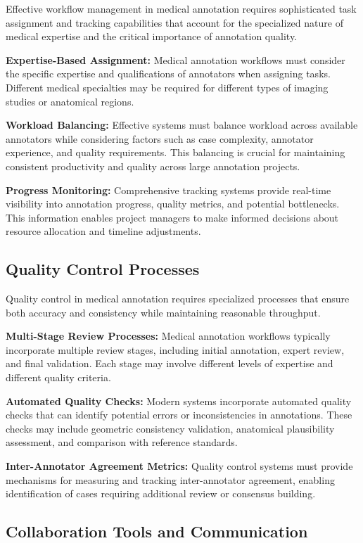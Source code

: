 Effective workflow management in medical annotation requires sophisticated task assignment and tracking capabilities that account for the specialized nature of medical expertise and the critical importance of annotation quality.

\textbf{Expertise-Based Assignment:} Medical annotation workflows must consider the specific expertise and qualifications of annotators when assigning tasks. Different medical specialties may be required for different types of imaging studies or anatomical regions.

\textbf{Workload Balancing:} Effective systems must balance workload across available annotators while considering factors such as case complexity, annotator experience, and quality requirements. This balancing is crucial for maintaining consistent productivity and quality across large annotation projects.

\textbf{Progress Monitoring:} Comprehensive tracking systems provide real-time visibility into annotation progress, quality metrics, and potential bottlenecks. This information enables project managers to make informed decisions about resource allocation and timeline adjustments.

\subsection{Quality Control Processes}

Quality control in medical annotation requires specialized processes that ensure both accuracy and consistency while maintaining reasonable throughput.

\textbf{Multi-Stage Review Processes:} Medical annotation workflows typically incorporate multiple review stages, including initial annotation, expert review, and final validation. Each stage may involve different levels of expertise and different quality criteria.

\textbf{Automated Quality Checks:} Modern systems incorporate automated quality checks that can identify potential errors or inconsistencies in annotations. These checks may include geometric consistency validation, anatomical plausibility assessment, and comparison with reference standards.

\textbf{Inter-Annotator Agreement Metrics:} Quality control systems must provide mechanisms for measuring and tracking inter-annotator agreement, enabling identification of cases requiring additional review or consensus building.

\subsection{Collaboration Tools and Communication}

